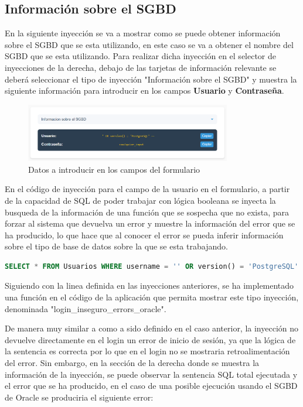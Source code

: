 \documentclass[a4paper,12pt]{article}
\begin{document}
\subsection{Información sobre el SGBD}

En la siguiente inyección se va a mostrar como se puede obtener información sobre el SGBD que se esta utilizando,
en este caso se va a obtener el nombre del SGBD que se esta utilizando.
Para realizar dicha inyección en el selector de inyecciones de la derecha,
debajo de las tarjetas de información relevante se deberá seleccionar el tipo de inyección "Información sobre el SGBD"
y muestra la siguiente información para introducir en los campos \textbf{Usuario} y \textbf{Contraseña}.

\begin{figure}[H]
    \centering
    \includegraphics[width=0.8\textwidth]{Imagenes/error9.png}
    \caption{Datos a introducir en los campos del formulario}
\end{figure}

En el código de inyección para el campo de la usuario en el formulario,
a partir de la capacidad de SQL de poder trabajar con lógica booleana se inyecta la busqueda de la información de una función
que se sospecha que no exista, para forzar al sistema que devuelva un error y muestre la información del error que se ha producido,
lo que hace que al conocer el error se pueda inferir información sobre el tipo de base de datos sobre la que se esta trabajando.

\begin{lstlisting}[language=SQL]
    SELECT * FROM Usuarios WHERE username = '' OR version() = 'PostgreSQL' --' AND password = 'cualquier_input'
\end{lstlisting}

Siguiendo con la linea definida en las inyecciones anteriores,
se ha implementado una función en el código de la aplicación que permita mostrar este tipo inyección,
denominada "login\_inseguro\_errors\_oracle".

De manera muy similar a como a sido definido en el caso anterior, la inyección no devuelve directamente en el login un error de inicio de sesión,
ya que la lógica de la sentencia es correcta por lo que en el login no se mostraria retroalimentación del error. Sin embargo,
en la sección de la derecha donde se muestra la información de la inyección, se puede observar la sentencia SQL total ejecutada y el error que se ha producido,
en el caso de una posible ejecución usando el SGBD de Oracle se produciria el siguiente error:
\end{document}
